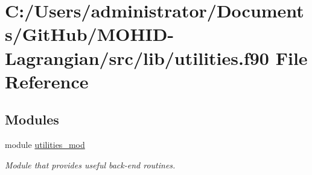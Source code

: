 \hypertarget{utilities_8f90}{}\section{C\+:/\+Users/administrator/\+Documents/\+Git\+Hub/\+M\+O\+H\+I\+D-\/\+Lagrangian/src/lib/utilities.f90 File Reference}
\label{utilities_8f90}
\subsection*{Modules}
\begin{DoxyCompactItemize}
\item 
module \mbox{\hyperlink{namespaceutilities__mod}{utilities\+\_\+mod}}
\begin{DoxyCompactList}\small\item\em Module that provides useful back-\/end routines. \end{DoxyCompactList}\end{DoxyCompactItemize}
